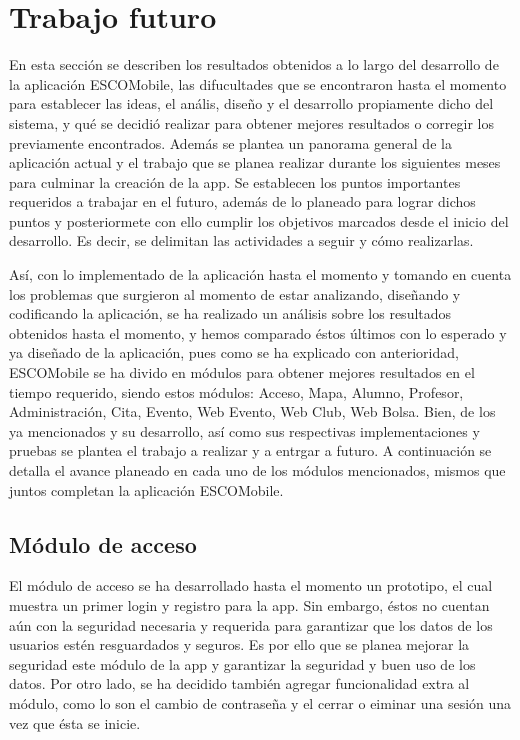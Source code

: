 \section{Trabajo futuro}
\noindent
En esta sección se describen los resultados obtenidos a lo largo del desarrollo de la aplicación ESCOMobile, las difucultades que se encontraron hasta el momento para establecer las ideas, el anális, diseño y el desarrollo propiamente dicho del sistema, y qué se decidió realizar para obtener mejores resultados o corregir los previamente encontrados. Además se plantea un panorama general de la aplicación actual y el trabajo que se planea realizar durante los siguientes meses para culminar la creación de la app. Se establecen los puntos importantes requeridos a trabajar en el futuro, además de lo planeado para lograr dichos puntos y posteriormete con ello cumplir los objetivos marcados desde el inicio del desarrollo. Es decir, se delimitan las actividades a seguir y cómo realizarlas. 

\noindent
Así, con lo implementado de la aplicación hasta el momento y tomando en cuenta los problemas que surgieron al momento de estar analizando, diseñando y codificando la aplicación, se ha realizado un análisis sobre los resultados obtenidos hasta el momento, y hemos comparado éstos últimos con lo esperado y ya diseñado de la aplicación, pues como se ha explicado con anterioridad, ESCOMobile se ha divido en módulos para obtener mejores resultados en el tiempo requerido, siendo estos módulos: Acceso, Mapa, Alumno, Profesor, Administración, Cita, Evento, Web Evento, Web Club, Web Bolsa. Bien, de los ya mencionados y su desarrollo, así como sus respectivas implementaciones y pruebas se plantea el trabajo a realizar y a entrgar a futuro. A continuación se detalla el avance planeado en cada uno de los módulos mencionados, mismos que juntos completan la aplicación ESCOMobile. \\

\subsection{Módulo de acceso}
\noindent
El módulo de acceso se ha desarrollado hasta el momento un prototipo, el cual muestra un primer login y registro para la app. Sin embargo, éstos no cuentan aún con la seguridad necesaria y requerida para garantizar que los datos de los usuarios estén resguardados y seguros. Es por ello que se planea mejorar la seguridad este módulo de la app y garantizar la seguridad y buen uso de los datos. Por otro lado, se ha decidido también agregar funcionalidad extra al módulo, como lo son el cambio de contraseña y el cerrar o eiminar una sesión una vez que ésta se inicie. \\

